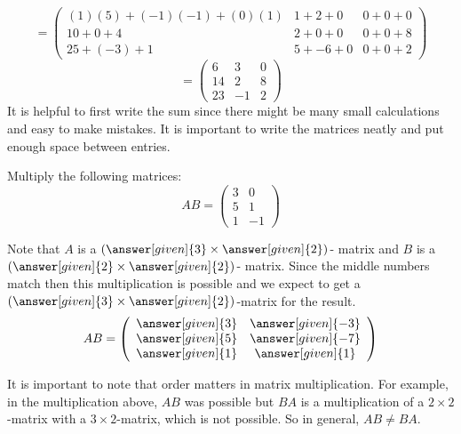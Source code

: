\documentclass{ximera}
\begin{document}
\[= \left(\begin{array}{ccc}
(1)(5) + (-1)(-1)+ (0)(1) & 1 + 2+ 0 & 0 + 0+ 0\\
10 + 0 + 4 & 2 + 0+0 & 0 + 0+8\\
25+ (-3) + 1 & 5 + -6+0 & 0 + 0+ 2
\end{array}\right)\]
\[= \left(\begin{array}{ccc}
6 & 3 & 0\\
14& 2 & 8\\
23 & -1 & 2
\end{array}\right)
\]
It is helpful to first write the sum since there might be many small calculations and easy to make mistakes. It is important to write the matrices neatly and put enough space between entries. 
\begin{question}
Multiply the following matrices:
\[AB = \left(\begin{array}{cc}
3 & 0 \\
5 & 1\\
1 & -1
\end{array}\right)
\]
\begin{prompt}
Note that $A$ is a $\left(\answer[given]{3}\times \answer[given]{2}\right)$- matrix and $B$ is a $\left(\answer[given]{2}\times \answer[given]{2}\right)$- matrix. Since the middle numbers match then this multiplication is possible and we expect to get a $\left(\answer[given]{3}\times \answer[given]{2}\right)$-matrix for the result. 
\[AB = \left(\begin{array}{cc}
\answer[given]{3} & \answer[given]{-3}\\
\answer[given]{5} & \answer[given]{-7}\\
\answer[given]{1} & \answer[given]{1}
\end{array}\right)\]
\end{prompt}
\end{question}
It is important to note that order matters in matrix multiplication. For example, in the multiplication above, $AB$ was possible but $BA$ is a multiplication of a $2\times 2$-matrix with a $3\times 2$-matrix, which is not possible. So in general, $AB \neq BA$. 
\end{document}
